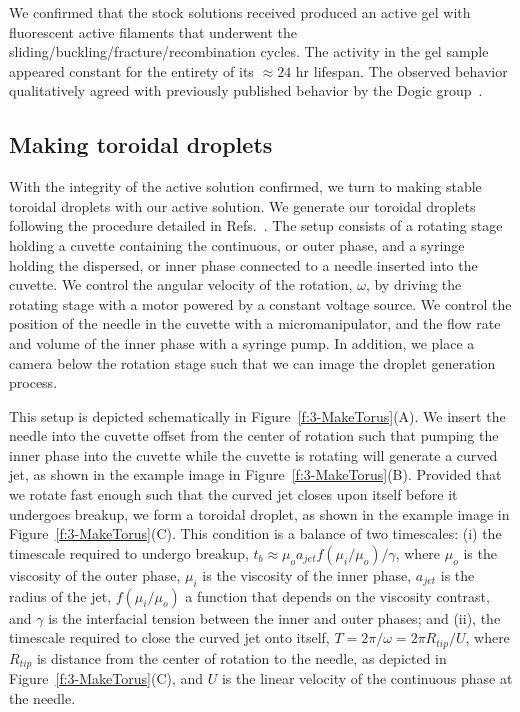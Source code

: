 We confirmed that the stock solutions received produced an active gel with fluorescent active filaments that underwent the sliding/buckling/fracture/recombination cycles.
The activity in the gel sample appeared constant for the entirety of its  $\approx 24$ hr lifespan.
The observed behavior qualitatively agreed with previously published behavior by the Dogic group~\cite{RN3}.


\subsection{Making toroidal droplets}
With the integrity of the active solution confirmed, we turn to making stable toroidal droplets with our active solution.
We generate our toroidal droplets following the procedure detailed in Refs.~\cite{RN29,RN47,RN257}.
The setup consists of a rotating stage holding a cuvette containing the continuous, or outer phase, and a syringe holding the dispersed, or inner phase connected to a needle inserted into the cuvette.
We control the angular velocity of the rotation, $\omega$, by driving the rotating stage with a motor powered by a constant voltage source.
We control the position of the needle in the cuvette with a micromanipulator, and the flow rate and volume of the inner phase with a syringe pump.
In addition, we place a camera below the rotation stage such that we can image the droplet generation process.

This setup is depicted schematically in Figure~\ref{f:3-MakeTorus}(A).
We insert the needle into the cuvette offset from the center of rotation such that pumping the inner phase into the cuvette while the cuvette is rotating will generate a curved jet, as shown in the example image in Figure~\ref{f:3-MakeTorus}(B).
Provided that we rotate fast enough such that the curved jet closes upon itself before it undergoes breakup, we form a toroidal droplet, as shown in the example image in Figure~\ref{f:3-MakeTorus}(C).
This condition is a balance of two timescales: (i) the timescale required to undergo breakup, $t_b \approx \mu_o a_{jet} f(\mu_i/\mu_o)/\gamma$, where $\mu_o$ is the viscosity of the outer phase, $\mu_i$ is the viscosity of the inner phase, $a_{jet}$ is the radius of the jet, $f(\mu_i/\mu_o)$ a function that depends on the viscosity contrast, and $\gamma$ is the interfacial tension between the inner and outer phases;
  and (ii), the timescale required to close the curved jet onto itself, $T = 2\pi/\omega = 2 \pi R_{tip}/U$, where $R_{tip}$ is distance from the center of rotation to the needle, as depicted in Figure~\ref{f:3-MakeTorus}(C), and $U$ is the linear velocity of the continuous phase at the needle.


